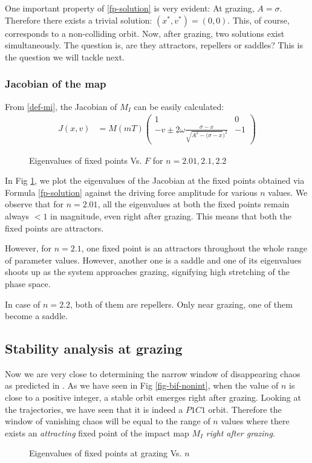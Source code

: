 \documentclass{book}
\renewcommand{\(}{\begin{columns}}
\renewcommand{\)}{\end{columns}}
\newcommand{\<}[1]{\begin{column}{#1}}
\renewcommand{\>}{\end{column}}
\begin{document}
One important property of  \eqref{fp-solution} is very evident:
At grazing, $A=\sigma$.  Therefore there exists a trivial solution: 
$(x^*,v^*)=(0,0)$.  This, of course, corresponds to a non-colliding orbit.  
Now, after grazing, two solutions exist simultaneously.  The question is, 
are they attractors, repellers or saddles? This is the question we will tackle 
next.  


\subsubsection{Jacobian of the map}
From \eqref{def-mi}, the Jacobian of $M_I$ can be easily calculated:
\begin{align}
\label{eq-jac-mi}
J(x,v)&=M(mT)
\begin{pmatrix}
1 & 0\\
-v\pm2\omega \frac{\sigma-x}{\sqrt{A^2-(\sigma-x})^2} & -1
\end{pmatrix}
\end{align}

\begin{figure}[!htp]
\begin{center}
\caption{Eigenvalues of fixed points Vs.  $F$ for $n=2.01,2.1,2.2$}
\label{fig-eigs-F}
\def\svgwidth{\columnwidth}

\end{center}
\end{figure}


In Fig \ref{fig-eigs-F}, we plot the eigenvalues of the Jacobian at the fixed 
points obtained via Formula \eqref{fp-solution} against the driving force 
amplitude for various $n$ values.  We observe that for $n=2.01$, all the 
eigenvalues at both the fixed points remain always $<1$ in magnitude, even right after grazing.  This 
means that both the fixed points are attractors.  


However, for $n=2.1$, one fixed point is an attractors throughout the whole 
range of parameter values.  However, another one is a saddle and one of its 
eigenvalues shoots up as the system approaches grazing, signifying high 
stretching of the phase space.  


In case of $n=2.2$, both of them are repellers.  Only near grazing, one of 
them become a saddle.   

\subsection{Stability analysis at grazing}
Now we are very close to determining the narrow window of disappearing chaos 
as predicted in \cite{banerjee-kundu-soft}. As we have seen in Fig 
\ref{fig-bif-nonint}, when the value of $n$ is close to a positive integer, a 
stable orbit emerges right after grazing.  Looking at the trajectories, we 
have seen that it is indeed a $P1C1$ orbit.  Therefore the window of vanishing 
chaos will be equal to the range of $n$ values where there exists an 
\emph{attracting} fixed point of the impact map $M_I$ \emph{right after grazing}.
\begin{figure}[!htp]
\centering
\caption{Eigenvalues of fixed points at grazing Vs. $n$}
\label{fig-eigs-n}
\def\svgwidth{\columnwidth}

\end{figure}
\end{document}
